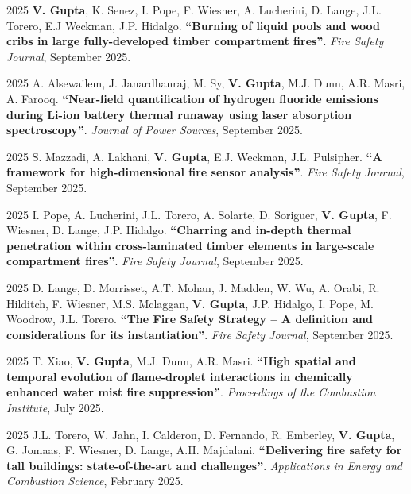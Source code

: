 \documentclass[12pt,letterpaper]{report}
\begin{document}
	\begin{tablist}			

    \item[2025] \tab \textbf{V. Gupta}, K. Senez, I. Pope, F. Wiesner, A. Lucherini, D. Lange, J.L. Torero, E.J Weckman, J.P. Hidalgo. \textbf{\enquote{Burning of liquid pools and wood cribs in large fully-developed timber compartment fires}}. \textit{Fire Safety Journal}, September 2025.

    \item[2025] \tab A. Alsewailem, J. Janardhanraj, M. Sy, \textbf{V. Gupta}, M.J. Dunn, A.R. Masri, A. Farooq. \textbf{\enquote{Near-field quantification of hydrogen fluoride emissions during Li-ion battery thermal runaway using laser absorption spectroscopy}}. \textit{Journal of Power Sources}, September 2025.
   
    \item[2025] \tab S. Mazzadi, A. Lakhani, \textbf{V. Gupta}, E.J. Weckman, J.L. Pulsipher. \textbf{\enquote{A framework for high-dimensional fire sensor analysis}}. \textit{Fire Safety Journal}, September 2025.

    \item[2025] \tab I. Pope, A. Lucherini, J.L. Torero, A. Solarte, D. Soriguer, \textbf{V. Gupta}, F. Wiesner, D. Lange, J.P. Hidalgo. \textbf{\enquote{Charring and in-depth thermal penetration within cross-laminated timber elements in large-scale compartment fires}}. \textit{Fire Safety Journal}, September 2025.

    \item[2025] \tab D. Lange, D. Morrisset, A.T. Mohan, J. Madden, W. Wu, A. Orabi, R. Hilditch, F. Wiesner, M.S. Mclaggan, \textbf{V. Gupta}, J.P. Hidalgo, I. Pope, M. Woodrow, J.L. Torero. \textbf{\enquote{The Fire Safety Strategy – A definition and considerations for its instantiation}}. \textit{Fire Safety Journal}, September 2025.

    \item[2025] \tab T. Xiao, \textbf{V. Gupta}, M.J. Dunn, A.R. Masri. \textbf{\enquote{High spatial and temporal evolution of flame-droplet interactions in chemically enhanced water mist fire suppression}}. \textit{Proceedings of the Combustion Institute}, July 2025.

	\item[2025] \tab J.L. Torero, W. Jahn, I. Calderon, D. Fernando, R. Emberley, \textbf{V. Gupta}, G. Jomaas, F. Wiesner, D. Lange, A.H. Majdalani. \textbf{\enquote{Delivering fire safety for tall buildings: state-of-the-art and challenges}}. \textit{Applications in Energy and Combustion Science}, February 2025.
        

\end{tablist}
\end{document}
